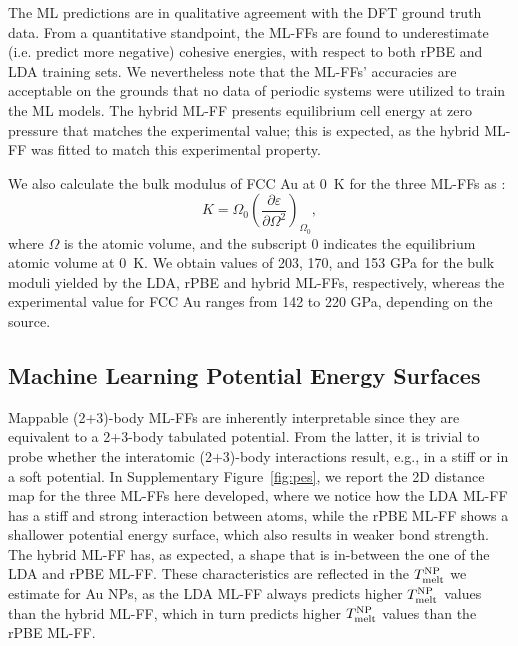 \documentclass[%
aip,
 amsmath,amssymb,
 reprint,
]{revtex4-1}
\newcommand*\subt[1]{_{\textnormal{#1}}}
\newcommand*\supt[1]{^{\textnormal{#1}}}
\begin{document}
The ML predictions are in qualitative agreement with the DFT ground truth data.
%
From a quantitative standpoint, the ML-FFs are found to underestimate (i.e. predict more negative) cohesive energies, with respect to both rPBE and LDA training sets.
%
We nevertheless note that the ML-FFs' accuracies are acceptable on the grounds that no data of periodic systems were utilized to train the ML models.
%
The hybrid ML-FF presents equilibrium cell energy at zero pressure that matches the experimental value; this is expected, as the hybrid ML-FF was fitted to match this experimental property.
%

We also calculate the bulk modulus of FCC Au at 0~K for the three ML-FFs as \cite{meyers2008mechanical}:
\begin{equation}
K = \Omega_0 \left( \dfrac{\partial \varepsilon}{\partial \Omega^2} \right)_{\Omega_0},
\end{equation}
%
where $\Omega$ is the atomic volume, and the subscript 0 indicates the equilibrium atomic volume at 0~K.
%
We obtain values of 203, 170, and 153 GPa for the bulk moduli yielded by the LDA, rPBE and hybrid ML-FFs, respectively, whereas the experimental value for FCC Au ranges from 142 to 220 GPa, depending on the source. \cite{kittel2005crystal, kelly2014properties, samsonov2012handbook}


\subsection*{Machine Learning Potential Energy Surfaces}
%
Mappable (2+3)-body ML-FFs are inherently interpretable since they are equivalent to a 2+3-body tabulated potential.
%
From the latter, it is trivial to probe whether the interatomic (2+3)-body interactions result, e.g., in a stiff or in a soft potential.
%
In Supplementary Figure~\ref{fig:pes}, we report the 2D distance map for the three ML-FFs here developed, where we notice how the LDA ML-FF has a stiff and strong interaction between atoms, while the rPBE ML-FF shows a shallower potential energy surface, which also results in weaker bond strength.
%
The hybrid ML-FF has, as expected, a shape that is in-between the one of the LDA and rPBE ML-FF.
%
These characteristics are reflected in the $T\subt{melt}\supt{NP}$ we estimate for Au NPs, as the LDA ML-FF always predicts higher $T\subt{melt}\supt{NP}$ values than the hybrid ML-FF, which in turn predicts higher $T\subt{melt}\supt{NP}$ values than the rPBE ML-FF.
%
\end{document}
